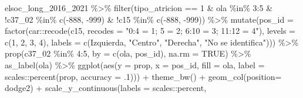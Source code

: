 \documentclass[
  12pt,
]{book}
\newenvironment{Shaded}{\begin{snugshade}}{\end{snugshade}}
\newcommand{\AttributeTok}[1]{\textcolor[rgb]{0.77,0.63,0.00}{#1}}
\newcommand{\ConstantTok}[1]{\textcolor[rgb]{0.00,0.00,0.00}{#1}}
\newcommand{\DecValTok}[1]{\textcolor[rgb]{0.00,0.00,0.81}{#1}}
\newcommand{\FunctionTok}[1]{\textcolor[rgb]{0.00,0.00,0.00}{#1}}
\newcommand{\NormalTok}[1]{#1}
\newcommand{\SpecialCharTok}[1]{\textcolor[rgb]{0.00,0.00,0.00}{#1}}
\newcommand{\StringTok}[1]{\textcolor[rgb]{0.31,0.60,0.02}{#1}}
\begin{document}
\begin{Shaded}
\begin{Highlighting}[]
\NormalTok{elsoc\_long\_2016\_2021 }\SpecialCharTok{\%\textgreater{}\%}
  \FunctionTok{filter}\NormalTok{(tipo\_atricion }\SpecialCharTok{==} \DecValTok{1} \SpecialCharTok{\&}\NormalTok{ ola }\SpecialCharTok{\%in\%} \DecValTok{3}\SpecialCharTok{:}\DecValTok{5} \SpecialCharTok{\&} \SpecialCharTok{!}\NormalTok{c37\_02 }\SpecialCharTok{\%in\%} \FunctionTok{c}\NormalTok{(}\SpecialCharTok{{-}}\DecValTok{888}\NormalTok{, }\SpecialCharTok{{-}}\DecValTok{999}\NormalTok{) }\SpecialCharTok{\&} \SpecialCharTok{!}\NormalTok{c15 }\SpecialCharTok{\%in\%} \FunctionTok{c}\NormalTok{(}\SpecialCharTok{{-}}\DecValTok{888}\NormalTok{, }\SpecialCharTok{{-}}\DecValTok{999}\NormalTok{)) }\SpecialCharTok{\%\textgreater{}\%}
  \FunctionTok{mutate}\NormalTok{(}\AttributeTok{pos\_id =} \FunctionTok{factor}\NormalTok{(car}\SpecialCharTok{::}\FunctionTok{recode}\NormalTok{(c15, }\AttributeTok{recodes =} \StringTok{"0:4 = 1; 5 = 2; 6:10 = 3; 11:12 = 4"}\NormalTok{),}
                         \AttributeTok{levels =} \FunctionTok{c}\NormalTok{(}\DecValTok{1}\NormalTok{, }\DecValTok{2}\NormalTok{, }\DecValTok{3}\NormalTok{, }\DecValTok{4}\NormalTok{),}
                         \AttributeTok{labels =} \FunctionTok{c}\NormalTok{(}\StringTok{\textquotesingle{}Izquierda\textquotesingle{}}\NormalTok{, }\StringTok{"Centro"}\NormalTok{, }\StringTok{"Derecha"}\NormalTok{, }\StringTok{"No se identifica"}\NormalTok{))) }\SpecialCharTok{\%\textgreater{}\%}
  \FunctionTok{prop}\NormalTok{(c37\_02 }\SpecialCharTok{\%in\%} \DecValTok{4}\SpecialCharTok{:}\DecValTok{5}\NormalTok{, }\AttributeTok{by =} \FunctionTok{c}\NormalTok{(ola, pos\_id), }\AttributeTok{na.rm =} \ConstantTok{TRUE}\NormalTok{) }\SpecialCharTok{\%\textgreater{}\%}
  \FunctionTok{as\_label}\NormalTok{(ola) }\SpecialCharTok{\%\textgreater{}\%} 
  \FunctionTok{ggplot}\NormalTok{(}\FunctionTok{aes}\NormalTok{(}\AttributeTok{y =}\NormalTok{ prop, }\AttributeTok{x =}\NormalTok{ pos\_id, }\AttributeTok{fill =}\NormalTok{ ola,  }
               \AttributeTok{label =}\NormalTok{ scales}\SpecialCharTok{::}\FunctionTok{percent}\NormalTok{(prop, }\AttributeTok{accuracy =}\NormalTok{ .}\DecValTok{1}\NormalTok{))) }\SpecialCharTok{+}
    \FunctionTok{theme\_bw}\NormalTok{() }\SpecialCharTok{+} 
    \FunctionTok{geom\_col}\NormalTok{(}\AttributeTok{position=} \StringTok{\textquotesingle{}dodge2\textquotesingle{}}\NormalTok{) }\SpecialCharTok{+}
    \FunctionTok{scale\_y\_continuous}\NormalTok{(}\AttributeTok{labels =}\NormalTok{ scales}\SpecialCharTok{::}\NormalTok{percent,}

\end{Highlighting}
\end{Shaded}
\end{document}
